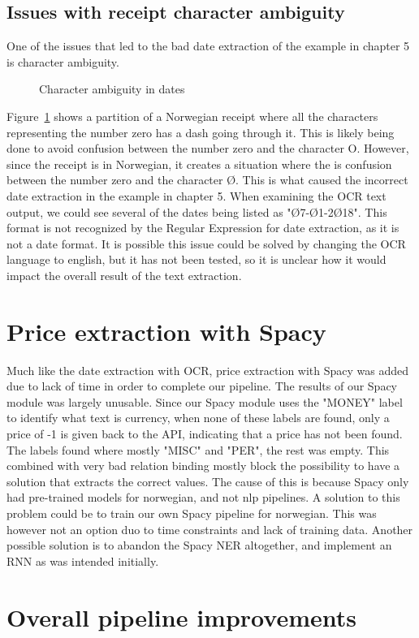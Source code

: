 \subsection{Issues with receipt character ambiguity}\label{subsec:issues-with-receipt-character-ambiguity}
One of the issues that led to the bad date extraction of the example in chapter 5 is character ambiguity.

\begin{figure}[h]
    \caption{Character ambiguity in dates}
    \label{fig:zeroletter}
\end{figure}

Figure~\ref{fig:zeroletter} shows a partition of a Norwegian receipt where all the characters representing the number
zero has a dash going through it.
This is likely being done to avoid confusion between the number zero and the character O.
However, since the receipt is in Norwegian, it creates a situation where the is confusion between the number zero and the character Ø.
This is what caused the incorrect date extraction in the example in chapter 5.
When examining the OCR text output, we could see several of the dates being listed as "Ø7-Ø1-2Ø18".
This format is not recognized by the Regular Expression for date extraction, as it is not a date format.
It is possible this issue could be solved by changing the OCR language to english, but it has not been tested, so it is unclear how it would impact the overall result of the text extraction.

\section{Price extraction with Spacy}\label{sec:price-extraction-with-spacy}
Much like the date extraction with OCR, price extraction with Spacy was added due to lack of time in order to complete our pipeline.
The results of our Spacy module was largely unusable.
Since our Spacy module uses the "MONEY" label to identify what text is currency, when none of these labels are found, only a price of -1 is given back to the API, indicating that a price has not been found.
The labels found where mostly "MISC" and "PER", the rest was empty.
This combined with very bad relation binding mostly block the possibility to have a solution that extracts the correct values.
The cause of this is because Spacy only had pre-trained models for norwegian, and not nlp pipelines.
A solution to this problem could be to train our own Spacy pipeline for norwegian.
This was however not an option duo to time constraints and lack of training data.
Another possible solution is to abandon the Spacy NER altogether, and implement an RNN as was intended initially.

\section{Overall pipeline improvements}\label{sec:overall-pipeline-improvements}